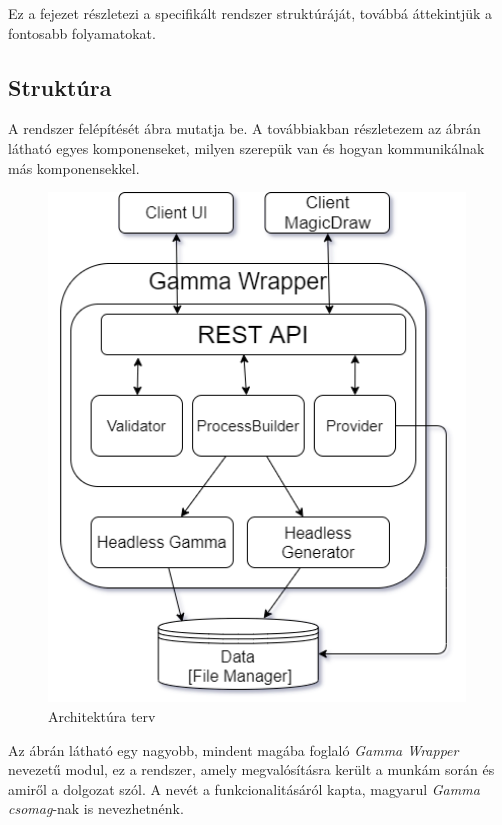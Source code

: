 Ez a fejezet részletezi a specifikált rendszer struktúráját, továbbá áttekintjük a fontosabb folyamatokat.
\subsection{Struktúra}

A rendszer felépítését  ábra mutatja be. A továbbiakban részletezem az ábrán látható egyes komponenseket, milyen szerepük van és hogyan kommunikálnak más komponensekkel.
\begin{figure}[!ht]
	\centering
	\includegraphics[height=135mm,keepaspectratio]{figures/architecture.png}
	\caption{Architektúra terv}
	\label{fig:structure}
\end{figure}
Az ábrán látható egy nagyobb, mindent magába foglaló \textit{Gamma Wrapper} nevezetű modul, ez a rendszer, amely megvalósításra került a munkám során és amiről a dolgozat szól. A nevét a funkcionalitásáról kapta, magyarul \textit{Gamma csomag}-nak is nevezhetnénk.

